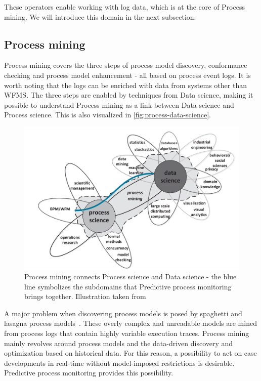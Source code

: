 These operators enable working with log data, which is at the core of Process mining.
We will introduce this domain in the next subsection.

\subsection{Process mining}\label{sec:process-mining}
Process mining covers the three steps of process model discovery, conformance checking and process model enhancement \cite{Aalst2016} -  all based on process event logs. It is worth noting that the logs can be enriched with data from systems other than WFMS. The three steps are enabled by techniques from Data science, making it possible to understand Process mining as a link between Data science and Process science. This is also visualized in \autoref{fig:process-data-science}.

\begin{figure}[!htb]
    \centering
    \includegraphics[width=.8\textwidth]{gfx/process-data-science.png}
    \caption[Process mining connects two disciplines]{Process mining connects Process science and Data science - the blue line symbolizes the subdomains that Predictive process monitoring brings together. Illustration taken from~\cite[p.18]{Aalst2016}}
    \label{fig:process-data-science}
\end{figure}

A major problem when discovering process models is posed by spaghetti and lasagna process models~\cite{Aalst2016}. These overly complex and unreadable models are mined from process logs that contain highly variable execution traces. Process mining mainly revolves around process models and the data-driven discovery and optimization based on historical data. For this reason, a possibility to act on case developments in real-time without model-imposed restrictions is desirable. Predictive process monitoring provides this possibility.

